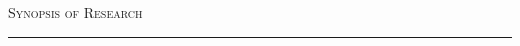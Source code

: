 \documentclass[a4paper,10pt]{article}
\newcommand{\mediumtitle}[1]{
	\vspace{0.2cm}
	{\noindent
	\Large \textsc{#1}\\[-2ex]
	\hrule
	\vspace{0.2cm}}
}
\newcommand{\dtlist}[2]{
\hspace{-3cm}
\noindent
	\begin{minipage}{0.22\textwidth}
	\begin{flushright}
	\textsc{#1}
	\end{flushright}
	\end{minipage}
	& #2\\[0.2cm]
}
\newcommand{\graybulletitem}{ \item[\textcolor{gray}{$\bullet$}]}
\begin{document}
%
%
%



\newpage


\mediumtitle{Synopsis of Research}
\end{document}
